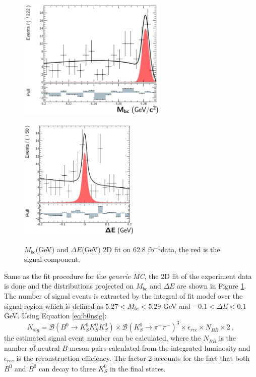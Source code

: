 \begin{figure}[htbp]
	\begin{minipage}[b]{0.5\linewidth}
		\centering 
		\includegraphics[height=5.8cm]{figures/mbc_2d_fit}
		\label{}
	\end{minipage}
	\begin{minipage}[b]{0.5\linewidth}
		\centering 
		\includegraphics[height=5.8cm]{figures/de_2d_fit}
		\label{}
	\end{minipage}
\caption{$M_{bc}$(GeV) and $\Delta E$(GeV) 2D fit on 62.8 fb$^{-1}$data, the red is the signal component.}
\label{fig:2Ddata}
\end{figure}

Same as the fit procedure for the \textit{generic MC}, the 2D fit of the experiment data is done and the distributions projected on $M_{bc}$ and $\Delta E$ are shown in Figure \ref{fig:2Ddata}.  The number of signal events is extracted by the integral of fit model over the signal region which is defined as $5.27 < M_{bc} < 5.29 $ GeV and $-0.1 < \Delta E < 0.1$ GeV.
 Using Equation \ref{eq:b0nsig}:
 \begin{equation}\label{eq:b0nsig}
  {N_{sig}}=
\mathcal{B}(B^0 \to K_S^0  K_S^0  K_S^0) \times {\mathcal{B}(K_S^0\to \pi^+\pi^-)^3\times
 	\epsilon_{rec}\times N_{B\bar{B}}\times 2} ~,
 \end{equation}
the estimated signal event number can be calculated, where the $N_{B\bar{B}}$ is the number of neutral $B$ meson pairs calculated from the integrated luminosity and $\epsilon_{rec}$ is the reconstruction efficiency. The factor 2 accounts for the fact that both $B^0$ and $\overline{B^0}$ can decay to three $K_S^0$ in the final states.

